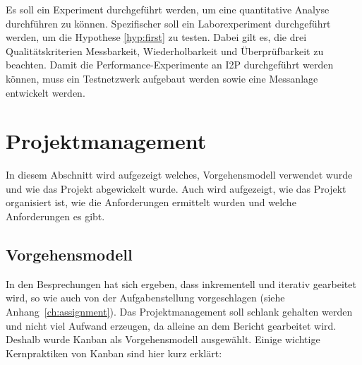 Es soll ein Experiment durchgeführt werden, um eine quantitative Analyse durchführen zu können.
Spezifischer soll ein Laborexperiment durchgeführt werden, um die Hypothese \ref{hyp:first} zu testen.
Dabei gilt es, die drei Qualitätskriterien Messbarkeit, Wiederholbarkeit und Überprüfbarkeit zu beachten.
Damit die Performance-Experimente an I2P durchgeführt werden können, muss ein Testnetzwerk aufgebaut werden sowie eine Messanlage entwickelt werden.
\parencite[S.~276]{helmut_balzert_wissenschaftliches_2017}

%
%



\section{Projektmanagement}\label{sec:projektinformationen}

In diesem Abschnitt wird aufgezeigt welches, Vorgehensmodell verwendet wurde und wie das Projekt abgewickelt wurde.
Auch wird aufgezeigt, wie das Projekt organisiert ist, wie die Anforderungen ermittelt wurden und welche Anforderungen es gibt.

\subsection{Vorgehensmodell}

In den Besprechungen hat sich ergeben, dass inkrementell und iterativ gearbeitet wird, so wie auch von der Aufgabenstellung vorgeschlagen (siehe Anhang~\ref{ch:assignment}).
Das Projektmanagement soll schlank gehalten werden und nicht viel Aufwand erzeugen, da alleine an dem Bericht gearbeitet wird.
Deshalb wurde Kanban als Vorgehensmodell ausgewählt.
Einige wichtige Kernpraktiken von Kanban sind hier kurz erklärt:

